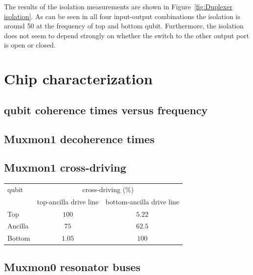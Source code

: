   The results of the isolation measurements are shown in Figure~\ref{fig:Duplexer isolation}. As can be seen in all four input-output combinations the isolation is around \SI{50}{\dBm} at the frequency of top and bottom qubit. Furthermore, the isolation does not seem to depend strongly on whether the switch to the other output port is open or closed.

\chapter{Chip characterization}
  \section{qubit coherence times versus frequency}

  \section{Muxmon1 decoherence times}
    \label{sec:Muxmon1 decoherence times}



  \section{Muxmon1 cross-driving}
    \label{sec:Muxmon1 cross-driving}
      \begin{table}
        \begin{tabular}{l c c}
          \toprule
          qubit & \multicolumn{2}{c}{cross-driving (\%)} \\
          \cmidrule(lr){2-3}
               & top-ancilla drive line & bottom-ancilla drive line \\
          \midrule
          Top     & $100$    & $5.22$ \\
          Ancilla & $75$ & $62.5$ \\
          Bottom  & $1.05$ & $100$    \\
          \bottomrule
        \end{tabular}
        \label{tab:Muxmon1 cross-driving}
      \end{table}

  \section{Muxmon0 resonator buses}
    \label{sec:Resonator buses}

